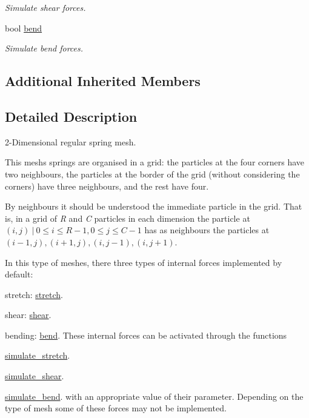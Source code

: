\begin{DoxyCompactItemize}
\begin{DoxyCompactList}\small\item\em Simulate shear forces. \end{DoxyCompactList}\item 
\mbox{\label{classphysim_1_1meshes_1_1mesh2d__regular_ab031a8ece45555e421c031b7c3fff4bd}} 
bool \hyperlink{classphysim_1_1meshes_1_1mesh2d__regular_ab031a8ece45555e421c031b7c3fff4bd}{bend}
\begin{DoxyCompactList}\small\item\em Simulate bend forces. \end{DoxyCompactList}\end{DoxyCompactItemize}
\subsection*{Additional Inherited Members}


\subsection{Detailed Description}
2-\/\+Dimensional regular spring mesh. 

This mesh\textquotesingle{}s springs are organised in a grid\+: the particles at the four corners have two neighbours, the particles at the border of the grid (without considering the corners) have three neighbours, and the rest have four.

By neighbours it should be understood the immediate particle in the grid. That is, in a grid of {\itshape R} and {\itshape C} particles in each dimension the particle at $(i,j)\:|\: 0 \le i \le R - 1, 0 \le j \le C - 1$ has as neighbours the particles at $(i-1,j),(i+1,j),(i,j-1),(i,j+1)$.

In this type of meshes, there three types of internal forces implemented by default\+:
\begin{DoxyItemize}
\item stretch\+: \hyperlink{classphysim_1_1meshes_1_1mesh2d__regular_a3101edd8212afd9a35ad11c6666e26be}{stretch}.
\item shear\+: \hyperlink{classphysim_1_1meshes_1_1mesh2d__regular_af25bf35485aa0a40e21a10f4e472721a}{shear}.
\item bending\+: \hyperlink{classphysim_1_1meshes_1_1mesh2d__regular_ab031a8ece45555e421c031b7c3fff4bd}{bend}. These internal forces can be activated through the functions
\item \hyperlink{classphysim_1_1meshes_1_1mesh2d__regular_a6d9ccf2226fb57cc3ffc04fd9612acdd}{simulate\+\_\+stretch}.
\item \hyperlink{classphysim_1_1meshes_1_1mesh2d__regular_a36293f6559978144527fb829efd63ea2}{simulate\+\_\+shear}.
\item \hyperlink{classphysim_1_1meshes_1_1mesh2d__regular_abc94712fdb508f126934bd2bde2cf867}{simulate\+\_\+bend}. with an appropriate value of their parameter. Depending on the type of mesh some of these forces may not be implemented. 
\end{DoxyItemize}

